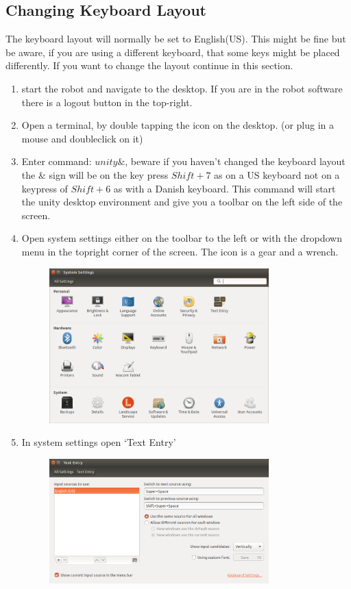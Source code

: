 \documentclass{article}
\begin{document}
\subsection{Changing Keyboard Layout}
The keyboard layout will normally be set to English(US). This might be fine but be aware, if you are using a different keyboard, that some keys might be placed differently. If you want to change the layout continue in this section.
\begin{enumerate}
\item start the robot and navigate to the desktop. If you are in the robot software there is a logout button in the top-right. 
\item Open a terminal, by double tapping the icon on the desktop. (or plug in a mouse and doubleclick on it)
\item Enter command: $unity\&$, beware if you haven't changed the keyboard layout the $\&$ sign will be on the key press $Shift+7$ as on a US keyboard not on a keypress of $Shift+6$ as with a Danish keyboard. This command will start the unity desktop environment and give you a toolbar on the left side of the screen.
\item Open system settings either on the toolbar to the left or with the dropdown menu in the topright corner of the screen. The icon is a gear and a wrench. 
\begin{figure}[H]\centering
  \includegraphics[width=0.8\textwidth]{../../Images/systemSettings.png}
\end{figure}
\item In system settings open ‘Text Entry’
\begin{figure}[H]\centering
  \includegraphics[width=0.8\textwidth]{../../Images/TextEntry.png}

\end{figure}
\end{enumerate}
\end{document}
